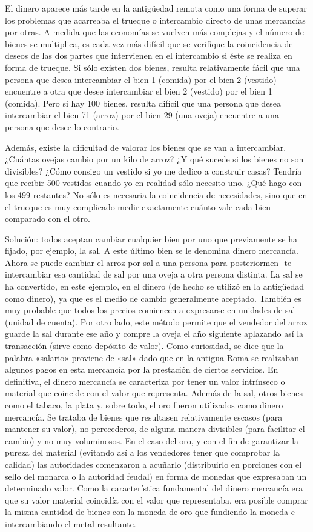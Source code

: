 \documentclass[
]{krantz}
\begin{document}
El dinero aparece más tarde en la antigüedad remota como una forma de superar los problemas que acarreaba el trueque o intercambio directo de unas mercancías por otras. A medida que las economías se vuelven más complejas y el número de bienes se multiplica, es cada vez más difícil que se verifique la coincidencia de deseos de las dos partes que intervienen en el intercambio si éste se realiza en forma de trueque. Si sólo existen dos bienes, resulta relativamente fácil que una persona que desea intercambiar el bien 1 (comida) por el bien 2 (vestido) encuentre a otra que desee intercambiar el bien 2 (vestido) por el bien 1 (comida). Pero si hay 100 bienes, resulta difícil que una persona que desea intercambiar el bien 71 (arroz) por el bien 29 (una oveja) encuentre a una persona que desee lo contrario.

Además, existe la dificultad de valorar los bienes que se van a intercambiar. ¿Cuántas ovejas cambio por un kilo de arroz? ¿Y qué sucede si los bienes no son divisibles? ¿Cómo consigo un vestido si yo me dedico a construir casas? Tendría que recibir 500 vestidos cuando yo en realidad sólo necesito uno. ¿Qué hago con los 499 restantes? No sólo es necesaria la coincidencia de necesidades, sino que en el trueque es muy complicado medir exactamente cuánto vale cada bien comparado con el otro.

Solución: todos aceptan cambiar cualquier bien por uno que previamente se ha ﬁjado, por ejemplo, la sal. A este último bien se le denomina dinero mercancía. Ahora se puede cambiar el arroz por sal a una persona para posteriormen- te intercambiar esa cantidad de sal por una oveja a otra persona distinta. La sal se ha convertido, en este ejemplo, en el dinero (de hecho se utilizó en la antigüedad como dinero), ya que es el medio de cambio generalmente aceptado. También es muy probable que todos los precios comiencen a expresarse en unidades de sal (unidad de cuenta). Por otro lado, este método permite que el vendedor del arroz guarde la sal durante ese año y compre la oveja el año siguiente aplazando así la transacción (sirve como depósito de valor). Como curiosidad, se dice que la palabra «salario» proviene de «sal» dado que en la antigua Roma se realizaban algunos pagos en esta mercancía por la prestación de ciertos servicios. En deﬁnitiva, el dinero mercancía se caracteriza por tener un valor intrínseco o material que coincide con el valor que representa. Además de la sal, otros bienes como el tabaco, la plata y, sobre todo, el oro fueron utilizados como dinero mercancía. Se trataba de bienes que resultasen relativamente escasos (para mantener su valor), no perecederos, de alguna manera divisibles (para facilitar el cambio) y no muy voluminosos. En el caso del oro, y con el ﬁn de garantizar la pureza del material (evitando así a los vendedores tener que comprobar la calidad) las autoridades comenzaron a acuñarlo (distribuirlo en porciones con el sello del monarca o la autoridad feudal) en forma de monedas que expresaban un determinado valor. Como la característica fundamental del dinero mercancía era que su valor material coincidía con el valor que representaba, era posible comprar la misma cantidad de bienes con la moneda de oro que fundiendo la moneda e intercambiando el metal resultante.
\end{document}
